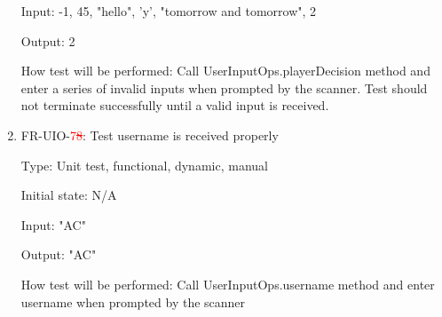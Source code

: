 \documentclass[12pt, titlepage]{article}
\begin{document}
\begin{enumerate}
    Input: -1, 45, "hello", 'y', "tomorrow and tomorrow", 2
    
    Output: 2
    
    How test will be performed: Call UserInputOps.playerDecision method and enter a series of invalid inputs when prompted by the scanner. Test should not terminate successfully until a valid input is received.
    
    \item{FR-UIO-\textcolor{red}{7\sout{8}}: Test username is received properly}
    
    Type: Unit test, functional, dynamic, manual
    
    Initial state: N/A
    
    Input: "AC"
    
    Output: "AC"
    
    How test will be performed: Call UserInputOps.username method and enter username when prompted by the scanner
\end{enumerate}
\end{document}
